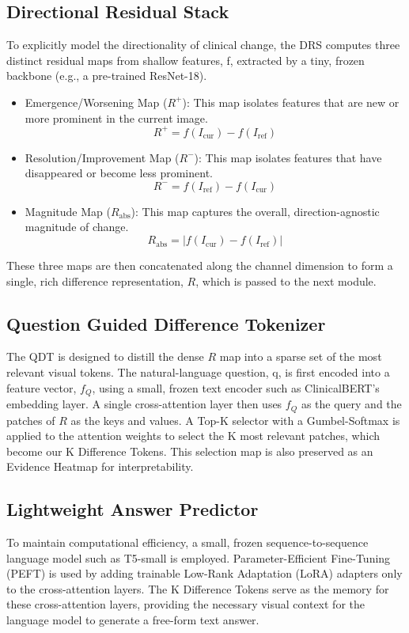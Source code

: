 \subsection{Directional Residual Stack}
To explicitly model the directionality of clinical change, the DRS computes three distinct residual maps from shallow features, f, extracted by a tiny, frozen backbone (e.g., a pre-trained ResNet-18).
\begin{itemize}
	\item Emergence/Worsening Map ($R^{+}$): This map isolates features that are new or more prominent in the current image.
	\[
	R^{+} = f(I_{\text{cur}}) - f(I_{\text{ref}})
	\]
	
	\item Resolution/Improvement Map ($R^{-}$): This map isolates features that have disappeared or become less prominent.
	\[
	R^{-} = f(I_{\text{ref}}) - f(I_{\text{cur}})
	\]
	
	\item Magnitude Map ($R_{\text{abs}}$): This map captures the overall, direction-agnostic magnitude of change.
	\[
	R_{\text{abs}} = |f(I_{\text{cur}}) - f(I_{\text{ref}})|
	\]
\end{itemize}

These three maps are then concatenated along the channel dimension to form a single, rich difference representation, $R$, which is passed to the next module.

\subsection{Question Guided Difference Tokenizer}
The QDT is designed to distill the dense $R$ map into a sparse set of the most relevant visual tokens. The natural-language question, q, is first encoded into a feature vector, $f_{Q}$, using a small, frozen text encoder such as ClinicalBERT's embedding layer. A single cross-attention layer then uses $f_{Q}$ as the query and the patches of $R$ as the keys and values. A Top-K selector with a Gumbel-Softmax is applied to the attention weights to select the K most relevant patches, which become our K Difference Tokens. This selection map is also preserved as an Evidence Heatmap for interpretability.

\subsection{Lightweight Answer Predictor}
To maintain computational efficiency, a small, frozen sequence-to-sequence language model such as T5-small is employed. Parameter-Efficient Fine-Tuning (PEFT) is used by adding trainable Low-Rank Adaptation (LoRA) adapters only to the cross-attention layers. The K Difference Tokens serve as the memory for these cross-attention layers, providing the necessary visual context for the language model to generate a free-form text answer.

